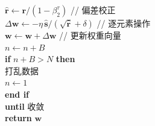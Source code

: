 \documentclass[../../main.tex]{subfiles}
\begin{document}
\begin{center}
{\begin{minipage}{0.82\textwidth}
\begin{flushleft}
\hspace*{1.5em}$\hat{\mathbf{r}}\leftarrow\mathbf{r}/(1-\beta_2^{\tau})$ \quad // 偏差校正\\
\hspace*{1.5em}$\Delta\mathbf{w}\leftarrow-\eta\,\hat{\mathbf{s}}/(\sqrt{\hat{\mathbf{r}}}+\delta)$ \quad // 逐元素操作\\
\hspace*{1.5em}$\mathbf{w}\leftarrow\mathbf{w}+\Delta\mathbf{w}$ \quad // 更新权重向量\\
\hspace*{1.5em}$n\leftarrow n+B$\\
\hspace*{1.5em}\textbf{if} $n+B>N$ \textbf{then}\\
\hspace*{3em}打乱数据\\
\hspace*{3em}$n\leftarrow 1$\\
\hspace*{1.5em}\textbf{end if}\\
\textbf{until} 收敛\\
\textbf{return} $\mathbf{w}$
\end{flushleft}
\end{minipage}}
\end{center}
\end{document}

